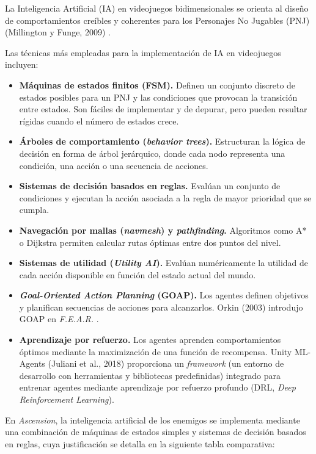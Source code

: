 La Inteligencia Artificial (IA) en videojuegos bidimensionales se orienta al diseño de comportamientos creíbles y coherentes para los Personajes No Jugables (PNJ) (Millington y Funge, 2009) \cite{MILLINGTON_AI}.

Las técnicas más empleadas para la implementación de IA en videojuegos incluyen:

\begin{itemize}
\item \textbf{Máquinas de estados finitos (FSM).} Definen un conjunto discreto de estados posibles para un PNJ y las condiciones que provocan la transición entre estados. Son fáciles de implementar y de depurar, pero pueden resultar rígidas cuando el número de estados crece.
\item \textbf{Árboles de comportamiento (\textit{behavior trees}).} Estructuran la lógica de decisión en forma de árbol jerárquico, donde cada nodo representa una condición, una acción o una secuencia de acciones.
\item \textbf{Sistemas de decisión basados en reglas.} Evalúan un conjunto de condiciones y ejecutan la acción asociada a la regla de mayor prioridad que se cumpla.
\item \textbf{Navegación por mallas (\textit{navmesh}) y \textit{pathfinding}.} Algoritmos como A* o Dijkstra permiten calcular rutas óptimas entre dos puntos del nivel.
\item \textbf{Sistemas de utilidad (\textit{Utility AI}).} Evalúan numéricamente la utilidad de cada acción disponible en función del estado actual del mundo.
\item \textbf{\textit{Goal-Oriented Action Planning} (GOAP).} Los agentes definen objetivos y planifican secuencias de acciones para alcanzarlos. Orkin (2003) introdujo GOAP en \textit{F.E.A.R.} \cite{ORKIN_2003}.
\item \textbf{Aprendizaje por refuerzo.} Los agentes aprenden comportamientos óptimos mediante la maximización de una función de recompensa. Unity ML-Agents (Juliani et al., 2018) \cite{JULIANI_2018} proporciona un \textit{framework} (un entorno de desarrollo con herramientas y bibliotecas predefinidas) integrado para entrenar agentes mediante aprendizaje por refuerzo profundo (DRL, \textit{Deep Reinforcement Learning}).
\end{itemize}

En \textit{Ascension}, la inteligencia artificial de los enemigos se implementa mediante una combinación de máquinas de estados simples y sistemas de decisión basados en reglas, cuya justificación se detalla en la siguiente tabla comparativa:


